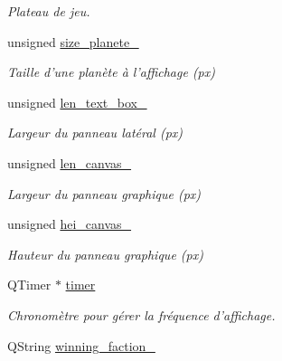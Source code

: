 \begin{DoxyCompactItemize}
\begin{DoxyCompactList}\small\item\em Plateau de jeu. \end{DoxyCompactList}\item 
\hypertarget{classDisplayer_abf6048109c2f782b47932babc1c72b79}{unsigned \hyperlink{classDisplayer_abf6048109c2f782b47932babc1c72b79}{size\-\_\-planete\-\_\-}}\label{classDisplayer_abf6048109c2f782b47932babc1c72b79}

\begin{DoxyCompactList}\small\item\em Taille d'une planète à l'affichage (px) \end{DoxyCompactList}\item 
\hypertarget{classDisplayer_aedcdc7b40771c068fb70f9f74b2d6689}{unsigned \hyperlink{classDisplayer_aedcdc7b40771c068fb70f9f74b2d6689}{len\-\_\-text\-\_\-box\-\_\-}}\label{classDisplayer_aedcdc7b40771c068fb70f9f74b2d6689}

\begin{DoxyCompactList}\small\item\em Largeur du panneau latéral (px) \end{DoxyCompactList}\item 
\hypertarget{classDisplayer_aff59f7de619d0d84e91aaf6087b55ebc}{unsigned \hyperlink{classDisplayer_aff59f7de619d0d84e91aaf6087b55ebc}{len\-\_\-canvas\-\_\-}}\label{classDisplayer_aff59f7de619d0d84e91aaf6087b55ebc}

\begin{DoxyCompactList}\small\item\em Largeur du panneau graphique (px) \end{DoxyCompactList}\item 
\hypertarget{classDisplayer_ae7d9e96ca745d502672369fc4d1cde5c}{unsigned \hyperlink{classDisplayer_ae7d9e96ca745d502672369fc4d1cde5c}{hei\-\_\-canvas\-\_\-}}\label{classDisplayer_ae7d9e96ca745d502672369fc4d1cde5c}

\begin{DoxyCompactList}\small\item\em Hauteur du panneau graphique (px) \end{DoxyCompactList}\item 
\hypertarget{classDisplayer_a9edd62c6f4cf550385c1dc9933e49d0e}{Q\-Timer $\ast$ \hyperlink{classDisplayer_a9edd62c6f4cf550385c1dc9933e49d0e}{timer}}\label{classDisplayer_a9edd62c6f4cf550385c1dc9933e49d0e}

\begin{DoxyCompactList}\small\item\em Chronomètre pour gérer la fréquence d'affichage. \end{DoxyCompactList}\item 
\hypertarget{classDisplayer_a77b8f1b3b40fd64c89e54f12e7b5a0df}{Q\-String \hyperlink{classDisplayer_a77b8f1b3b40fd64c89e54f12e7b5a0df}{winning\-\_\-faction\-\_\-}}\label{classDisplayer_a77b8f1b3b40fd64c89e54f12e7b5a0df}


\end{DoxyCompactItemize}
